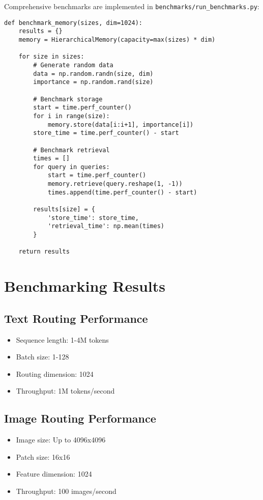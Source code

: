 \documentclass[10pt]{article}
\begin{document}
Comprehensive benchmarks are implemented in \texttt{benchmarks/run\_benchmarks.py}:

\begin{verbatim}
def benchmark_memory(sizes, dim=1024):
    results = {}
    memory = HierarchicalMemory(capacity=max(sizes) * dim)
    
    for size in sizes:
        # Generate random data
        data = np.random.randn(size, dim)
        importance = np.random.rand(size)
        
        # Benchmark storage
        start = time.perf_counter()
        for i in range(size):
            memory.store(data[i:i+1], importance[i])
        store_time = time.perf_counter() - start
        
        # Benchmark retrieval
        times = []
        for query in queries:
            start = time.perf_counter()
            memory.retrieve(query.reshape(1, -1))
            times.append(time.perf_counter() - start)
        
        results[size] = {
            'store_time': store_time,
            'retrieval_time': np.mean(times)
        }
    
    return results
\end{verbatim}

\section{Benchmarking Results}

\subsection{Text Routing Performance}
\begin{itemize}
    \item Sequence length: 1-4M tokens
    \item Batch size: 1-128
    \item Routing dimension: 1024
    \item Throughput: 1M tokens/second
\end{itemize}

\subsection{Image Routing Performance}
\begin{itemize}
    \item Image size: Up to 4096x4096
    \item Patch size: 16x16
    \item Feature dimension: 1024
    \item Throughput: 100 images/second
\end{itemize}
\end{document}
